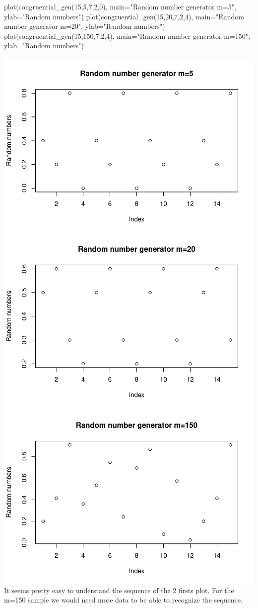 \documentclass[
]{article}
\newenvironment{Shaded}{\begin{snugshade}}{\end{snugshade}}
\newcommand{\AttributeTok}[1]{\textcolor[rgb]{0.77,0.63,0.00}{#1}}
\newcommand{\DecValTok}[1]{\textcolor[rgb]{0.00,0.00,0.81}{#1}}
\newcommand{\FunctionTok}[1]{\textcolor[rgb]{0.00,0.00,0.00}{#1}}
\newcommand{\NormalTok}[1]{#1}
\newcommand{\StringTok}[1]{\textcolor[rgb]{0.31,0.60,0.02}{#1}}
\begin{document}
\begin{Shaded}
\begin{Highlighting}[]
\FunctionTok{plot}\NormalTok{(}\FunctionTok{congruential\_gen}\NormalTok{(}\DecValTok{15}\NormalTok{,}\DecValTok{5}\NormalTok{,}\DecValTok{7}\NormalTok{,}\DecValTok{2}\NormalTok{,}\DecValTok{0}\NormalTok{), }\AttributeTok{main=}\StringTok{"Random number generator m=5"}\NormalTok{, }\AttributeTok{ylab=}\StringTok{"Random numbers"}\NormalTok{)}
\FunctionTok{plot}\NormalTok{(}\FunctionTok{congruential\_gen}\NormalTok{(}\DecValTok{15}\NormalTok{,}\DecValTok{20}\NormalTok{,}\DecValTok{7}\NormalTok{,}\DecValTok{2}\NormalTok{,}\DecValTok{4}\NormalTok{), }\AttributeTok{main=}\StringTok{"Random number generator m=20"}\NormalTok{, }\AttributeTok{ylab=}\StringTok{"Random numbers"}\NormalTok{)}
\FunctionTok{plot}\NormalTok{(}\FunctionTok{congruential\_gen}\NormalTok{(}\DecValTok{15}\NormalTok{,}\DecValTok{150}\NormalTok{,}\DecValTok{7}\NormalTok{,}\DecValTok{2}\NormalTok{,}\DecValTok{4}\NormalTok{), }\AttributeTok{main=}\StringTok{"Random number generator m=150"}\NormalTok{, }\AttributeTok{ylab=}\StringTok{"Random numbers"}\NormalTok{)}
\end{Highlighting}
\end{Shaded}

\includegraphics[width=0.5\linewidth]{Exercicen2_files/figure-latex/unnamed-chunk-3-1}
\includegraphics[width=0.5\linewidth]{Exercicen2_files/figure-latex/unnamed-chunk-3-2}
\includegraphics[width=0.5\linewidth]{Exercicen2_files/figure-latex/unnamed-chunk-3-3}
It seems pretty easy to understand the sequence of the 2 firsts plot.
For the m=150 sample we would need more data to be able to recognize the
sequence.
\end{document}
